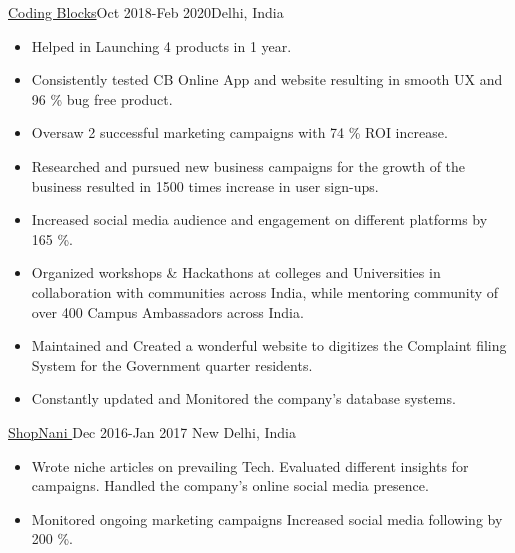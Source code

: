 \documentclass[10pt,a4paper,ragged2e]{altacv}
\begin{document}
 {\color{mecol}\href{https://codingblocks.com}{Coding Blocks}}{Oct 2018-Feb 2020}{Delhi, India}
\begin{itemize}
\item Helped in Launching 4 products in 1 year. 
\item Consistently tested CB Online App and website resulting in smooth UX and 96 \% bug free product.
\item Oversaw 2 successful marketing campaigns with 74 \% ROI increase. 
\item Researched and pursued new business campaigns for the growth of the business resulted in 1500 times increase in user sign-ups.
\item Increased social media audience and engagement on different platforms by 165 \%.
\item Organized workshops \& Hackathons at colleges and Universities in collaboration with communities across India, while mentoring community of over 400 Campus Ambassadors across India.
\end{itemize}

    
\divider

\begin{itemize}
\item Maintained and Created a wonderful website to digitizes the Complaint filing System for the Government quarter residents. 
\item Constantly updated and Monitored the company’s database systems.

\end{itemize}
    
\divider

 {\color{mecol}\href{https://blog.shopnani.com/}{ShopNani }}{Dec 2016-Jan 2017 }{New Delhi, India}

\begin{itemize}
\item Wrote niche articles on  prevailing Tech. Evaluated different insights for campaigns. Handled the company’s online social media presence.
 \item Monitored ongoing marketing campaigns Increased social media following by 200 \%.

\end{itemize}
\end{document}

